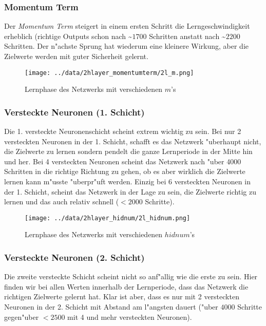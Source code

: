 \documentclass[10pt]{article}
\begin{document}
\subsubsection{Momentum Term}

Der \textit{Momentum Term} steigert in einem ersten Schritt die Lerngeschwindigkeit erheblich (richtige Outputs schon nach \textasciitilde $1700$ Schritten anstatt nach \textasciitilde $2200$ Schritten. Der n"achste Sprung hat wiederum eine kleinere Wirkung, aber die Zielwerte werden mit guter Sicherheit gelernt.

\begin{figure}[h!]
\centering
\texttt{[image: ../data/2hlayer\_momentumterm/2l\_m.png]}
\caption{Lernphase des Netzwerks mit verschiedenen $m$'s}
\end{figure}

\subsubsection{Versteckte Neuronen (1. Schicht)}

Die 1. versteckte Neuronenschicht scheint extrem wichtig zu sein. Bei nur 2 versteckten Neuronen in der 1. Schicht, schafft es das Netzwerk "uberhaupt nicht, die Zielwerte zu lernen sondern pendelt die ganze Lernperiode in der Mitte hin und her.
Bei 4 versteckten Neuronen scheint das Netzwerk nach "uber 4000 Schritten in die richtige Richtung zu gehen, ob es aber wirklich die Zielwerte lernen kann m"usste "uberpr"uft werden.
Einzig bei 6 versteckten Neuronen in der 1. Schicht, scheint das Netzwerk in der Lage zu sein, die Zielwerte richtig zu lernen und das auch relativ schnell ($< 2000$ Schritte).

\begin{figure}[h!]
\centering
\texttt{[image: ../data/2hlayer\_hidnum/2l\_hidnum.png]}
\caption{Lernphase des Netzwerks mit verschiedenen $hidnum$'s}
\end{figure}

\subsubsection{Versteckte Neuronen (2. Schicht)}

Die zweite versteckte Schicht scheint nicht so anf"allig wie die erste zu sein. Hier finden wir bei allen Werten innerhalb der Lernperiode, dass das Netzwerk die richtigen Zielwerte gelernt hat. Klar ist aber, dass es nur mit 2 versteckten Neuronen in der 2. Schicht mit Abstand am l"angsten dauert ("uber $4000$ Schritte gegen"uber $<2500$ mit 4 und mehr versteckten Neuronen).
\end{document}
